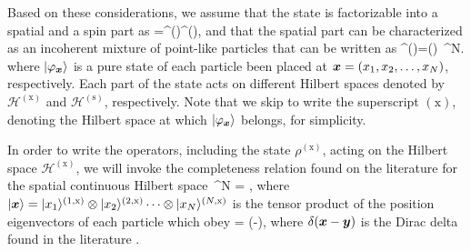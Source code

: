 Based on these considerations, we assume that the state is factorizable into a spatial and a spin part as
\be
\label{eq:gm-separated-internal-and-external}
\rho=\rho^{()}\otimes\rho^{()},
\ee
and that the spatial part can be characterized as an incoherent mixture of point-like particles that can be written as
\be
  \rho^{()}=\int \prob() \,^N.
  \label{eq:gm-pre-thermal-state}
\ee
where $\vert{\varphi_{\ensuremath{\boldsymbol{x}}}}\rangle$ is a pure state of each particle been placed at $\boldsymbol{x}=(x_1,x_2,\dots,x_N)$, respectively.
Each part of the state acts on different Hilbert spaces denoted by $\mathcal{H}^{(\text{x})}$ and $\mathcal{H}^{(\text{s})}$, respectively.
Note that we skip to write the superscript $(\text{x})$, denoting the Hilbert space at which $\vert{\varphi_{\ensuremath{\boldsymbol{x}}}}\rangle$ belongs, for simplicity.

In order to write the operators, including the state $\rho^{(\text{x})}$, acting on the Hilbert space $\mathcal{H}^{(\text{x})}$, we will invoke the completeness relation found on the literature \citep{Sakurai2010, Cohen-Tannoudji1977} for the spatial continuous Hilbert space
\be
  \int {}\,^N = \mtxid,
\ee
where $\vert{\ensuremath{\boldsymbol{x}}}\rangle=\vert{x_1}\rangle^{(1,\text{x})}\otimes\vert{x_2}\rangle^{(2,\text{x})}\cdots\otimes\vert{x_N}\rangle^{(N,\text{x})}$ is the tensor product of the position eigenvectors of each particle which obey
\be
   = \delta(-),
\ee
where $\delta(\boldsymbol{x}-\boldsymbol{y})$ is the Dirac delta found in the literature \citep{Sakurai2010, Cohen-Tannoudji1977}.

